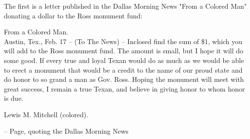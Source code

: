 \documentclass[12pt]{article}
\begin{document}
The first is a letter published in the Dallas Morning News "From a Colored Man" donating a dollar to the Ross monument fund:
\begin{displayquote}
From a Colored Man. \\
Austin, Tex., Feb. 17 – (To The News) – Inclosed find the sum of \$1, which you will add to the Ross monument fund.  The amount is small, but I hope it will do some good.  If every true and loyal Texan would do as much as we would be able to erect a monument that would be a credit to the name of our proud state and do honor to so grand a man as Gov. Ross.  Hoping the monument will meet with great success, I remain a true Texan, and believe in giving honor to whom honor is due.
  
Lewis M. Mitchell (colored).

-- Page, quoting the Dallas Morning News \cite{page}
\end{displayquote}
\end{document}
